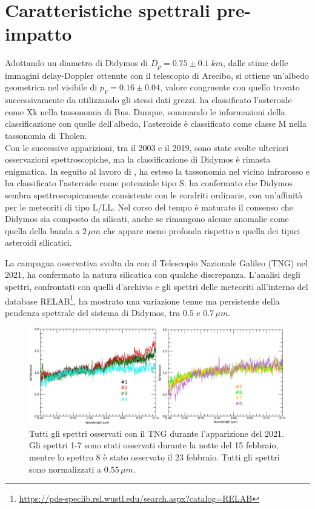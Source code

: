 \documentclass[a4paper,11pt,openright]{book}
\begin{document}
\section{Caratteristiche spettrali pre-impatto}
Adottando un diametro di Didymos di $D_p=0.75 \pm 0.1\; km$, dalle stime delle immagini delay-Doppler ottenute con il telescopio di Arecibo, si ottiene un'albedo geometrica nel visibile di $p_V=0.16 \pm 0.04$, valore congruente con quello trovato successivamente da \citet{naidu_radar_2020} utilizzando gli stessi dati grezzi. \citet{binzel_observed_2004} ha classificato l'asteroide come Xk nella tassonomia di Bus. Dunque, sommando le informazioni della classificazione con quelle dell'albedo, l'asteroide è classificato come classe M nella tassonomia di Tholen.\\
Con le successive apparizioni, tra il 2003 e il 2019, sono state svolte ulteriori osservazioni spettroscopiche, ma la classificazione di Didymos è rimasta enigmatica. In seguito al lavoro di \citet{binzel_observed_2004}, \citet{de_leon_spectral_2006, de_leon_observations_2010} ha esteso la tassonomia nel vicino infrarosso e ha classificato l'asteroide come potenziale tipo S. \citet{dunn_mineralogies_2013} ha confermato che Didymos sembra spettroscopicamente consistente con le condriti ordinarie, con un'affinità per le meteoriti di tipo L/LL. Nel corso del tempo è maturato il consenso che Didymos sia composto da silicati, anche se rimangono alcune anomalie come quella della banda a $2\,\mu m$ che appare meno profonda rispetto a quella dei tipici asteroidi silicatici. 

La campagna osservativa svolta da \citet{ieva_spectral_2022} con il Telescopio Nazionale Galileo (TNG) nel 2021, ha confermato la natura silicatica con qualche discrepanza. L'analisi degli spettri, confrontati con quelli d'archivio e gli spettri delle meteoriti all'interno del database RELAB\footnote{\href{https://pds-speclib.rsl.wustl.edu/search.aspx?catalog=RELAB}{https://pds-speclib.rsl.wustl.edu/search.aspx?catalog=RELAB}}, ha mostrato una variazione tenue ma persistente della pendenza spettrale del sistema di Didymos, tra $0.5$ e $0.7\,\mu m$. 

\begin{figure}[!h]
    \centering
    \includegraphics[scale=0.65]{figure/spettri_tot_ieva.jpg}
    \caption[Spettri osservati con il TNG durante l'apparizione del 2021.]{Tutti gli spettri osservati con il TNG durante l'apparizione del 2021. Gli spettri 1-7 sono stati osservati durante la notte del 15 febbraio, mentre lo spettro 8 è stato osservato il 23 febbraio. Tutti gli spettri sono normalizzati a $0.55\,\mu m$. \citep{ieva_spectral_2022}}
    \label{fig:spettri_tot_ieva}
\end{figure}
\end{document}
